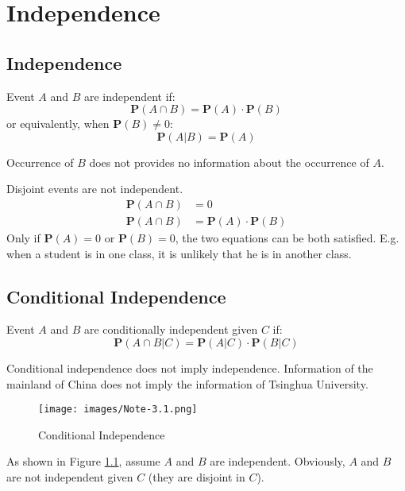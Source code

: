 \chapter{Independence}
\section{Independence}
\begin{definition}[Independence]
    Event $A$ and $B$ are independent if:
    \begin{equation}
        \mathbf{P}(A \cap B) = \mathbf{P}(A) \cdot \mathbf{P}(B)
    \end{equation}
    or equivalently, when $\mathbf{P}(B) \neq 0$:
    \begin{equation}
        \mathbf{P}(A|B) = \mathbf{P}(A)
    \end{equation}
\end{definition}
Occurrence of $B$ does not provides no information about the occurrence of $A$.

\begin{remark}
    Disjoint events are not independent.
    \begin{equation}
    \begin{aligned}
        \mathbf{P}(A \cap B) &= 0 \\
        \mathbf{P}(A \cap B) &= \mathbf{P}(A) \cdot \mathbf{P}(B)
    \end{aligned}
    \end{equation}
    Only if $\mathbf{P}(A) = 0$ or $\mathbf{P}(B) = 0$, the two equations can be both satisfied. E.g. when a student is in one class, it is unlikely that he is in another class.
\end{remark}

\section{Conditional Independence}
\begin{definition}
    Event $A$ and $B$ are conditionally independent given $C$ if:
    \begin{equation}
        \mathbf{P}(A \cap B | C) = \mathbf{P}(A | C) \cdot \mathbf{P}(B | C)
    \end{equation}
\end{definition}
\begin{remark}
    Conditional independence does not imply independence. Information of the mainland of China does not imply the information of Tsinghua University.
\begin{figure}[H]
    \centering
    \texttt{[image: images/Note-3.1.png]}
    \caption{Conditional Independence}
    \label{fig:conditional-independence}
\end{figure}
As shown in Figure \ref{fig:conditional-independence}, assume $A$ and $B$ are independent. Obviously, $A$ and $B$ are not independent given $C$ (they are disjoint in $C$).
\end{remark}

